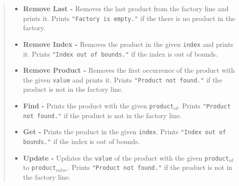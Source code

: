 \documentclass[10pt]{article}
\begin{document}
\begin{quote}
\begin{itemize}
    \item \textbf{Remove Last - } Removes the last product from the factory line and prints it. Prints \verb|"Factory is empty."| if the there is no product in the factory. \hfill \\ [10pt]
    \vspace{7pt}
    
    \item \textbf{Remove Index - } Removes the product in the given \texttt{index} and prints it. Prints \verb|"Index out of bounds."| if the index is out of bounds.   \hfill \\ [10pt]
    \vspace{7pt}
    
    \item \textbf{Remove Product - } Removes the first occurrence of the product with the given \texttt{value} and prints it. Prints \verb|"Product not found."| if the product is not in the factory line. \hfill \\ [10pt]
    \vspace{7pt}
    
    \item \textbf{Find - } Prints the product with the given \texttt{product$_{id}$}. Prints \verb|"Product not found."| if the product is not in the factory line. \hfill \\ [10pt]
    \vspace{7pt}
    
    \item \textbf{Get - } Prints the product in the given \texttt{index}. Prints \verb|"Index out of bounds."| if the index is out of bounds. \hfill \\ [10pt]
    \vspace{7pt}
    
    \item \textbf{Update - } Updates the \texttt{value} of the product with the given \texttt{product$_{id}$} to \texttt{product$_{value}$}. Prints \verb|"Product not found."| if the product is not in the factory line. \hfill \\ [10pt]
    \vspace{7pt}


\end{itemize}
\end{quote}
\end{document}
